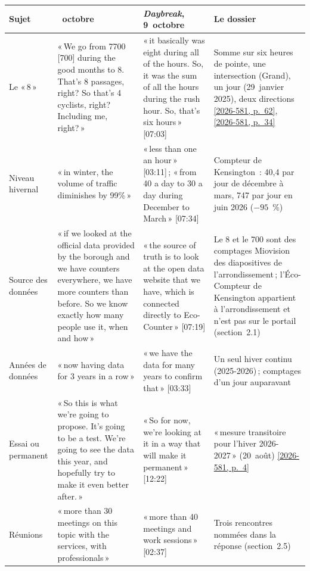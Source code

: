 \documentclass[11pt,letterpaper]{article}
\newcommand{\pagesurl}{https://openmobilitydata.github.io/Terrebonne-access-requests}
\newcommand{\cliptime}[1]{\textsf{\small[#1]}}
\newcommand{\pgl}[2]{\href{\pagesurl/2026-581/raw/01_emails_mandate_counts.pdf\#page=#1}{\textsf{\small[2026-581, p.~#2]}}}
\newcommand{\pg}[1]{\pgl{#1}{#1}}
\begin{document}
\begin{small}
\begin{longtable}{>{\raggedright\arraybackslash}p{2.2cm}>{\raggedright\arraybackslash}p{4.4cm}>{\raggedright\arraybackslash}p{4.4cm}>{\raggedright\arraybackslash}p{3.6cm}}
\toprule
Sujet & 6~octobre & \emph{Daybreak}, 9~octobre & Le dossier \\
\midrule
\endhead
Le «\,8\,» & «\,We go from 7700 [700] during the good months to 8. That's 8 passages, right? So that's 4 cyclists, right? Including me, right?\,» & «\,it basically was eight during all of the hours. So, it was the sum of all the hours during the rush hour. So, that's six hours\,» \cliptime{07:03} & Somme sur six heures de pointe, une intersection (Grand), un jour (29~janvier 2025), deux directions \pg{62}, \pg{34} \\
\addlinespace
Niveau hivernal & «\,in winter, the volume of traffic diminishes by 99\%\,» & «\,less than one an hour\,» \cliptime{03:11}\,; «\,from 40 a day to 30 a day during December to March\,» \cliptime{07:34} & Compteur de Kensington~: 40{,}4 par jour de décembre à mars, 747 par jour en juin 2026 ($-95$~\%) \\
\addlinespace
Source des données & «\,if we looked at the official data provided by the borough and we have counters everywhere, we have more counters than before. So we know exactly how many people use it, when and how\,» & «\,the source of truth is to look at the open data website that we have, which is connected directly to Eco-Counter\,» \cliptime{07:19} & Le 8 et le 700 sont des comptages Miovision des diapositives de l'arrondissement\,; l'Éco-Compteur de Kensington appartient à l'arrondissement et n'est pas sur le portail (section~2.1) \\
\addlinespace
Années de données & «\,now having data for 3 years in a row\,» & «\,we have the data for many years to confirm that\,» \cliptime{03:33} & Un seul hiver continu (2025-2026)\,; comptages d'un jour auparavant \\
\addlinespace
Essai ou permanent & «\,So this is what we're going to propose. It's going to be a test. We're going to see the data this year, and hopefully try to make it even better after.\,» & «\,So for now, we're looking at it in a way that will make it permanent\,» \cliptime{12:22} & «\,mesure transitoire pour l'hiver 2026-2027\,» (20~août) \pg{4} \\
\addlinespace
Réunions & «\,more than 30 meetings on this topic with the services, with professionals\,» & «\,more than 40 meetings and work sessions\,» \cliptime{02:37} & Trois rencontres nommées dans la réponse (section~2.5) \\

\end{longtable}
\end{small}
\end{document}
